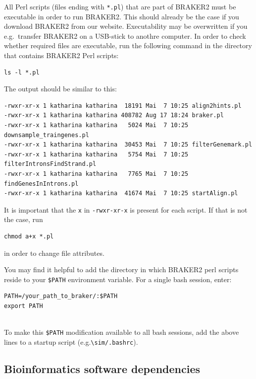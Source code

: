\documentclass[]{article}
\begin{document}
All Perl scripts (files ending with \texttt{*.pl}) that are part of
BRAKER2 must be executable in order to run BRAKER2. This should already
be the case if you download BRAKER2 from our website. Executability may
be overwritten if you e.g.~transfer BRAKER2 on a USB-stick to anothre
computer. In order to check whether required files are executable, run
the following command in the directory that contains BRAKER2 Perl
scripts:

\begin{verbatim}
ls -l *.pl
\end{verbatim}

The output should be similar to this:

\begin{verbatim}
-rwxr-xr-x 1 katharina katharina  18191 Mai  7 10:25 align2hints.pl
-rwxr-xr-x 1 katharina katharina 408782 Aug 17 18:24 braker.pl
-rwxr-xr-x 1 katharina katharina   5024 Mai  7 10:25 downsample_traingenes.pl
-rwxr-xr-x 1 katharina katharina  30453 Mai  7 10:25 filterGenemark.pl
-rwxr-xr-x 1 katharina katharina   5754 Mai  7 10:25 filterIntronsFindStrand.pl
-rwxr-xr-x 1 katharina katharina   7765 Mai  7 10:25 findGenesInIntrons.pl
-rwxr-xr-x 1 katharina katharina  41674 Mai  7 10:25 startAlign.pl
\end{verbatim}

It is important that the \texttt{x} in \texttt{-rwxr-xr-x} is present
for each script. If that is not the case, run

\begin{verbatim}
chmod a+x *.pl
\end{verbatim}

in order to change file attributes.

You may find it helpful to add the directory in which BRAKER2 perl
scripts reside to your \texttt{\$PATH} environment variable. For a
single bash session, enter:

\begin{verbatim}
PATH=/your_path_to_braker/:$PATH
export PATH
    
\end{verbatim}

To make this \texttt{\$PATH} modification available to all bash
sessions, add the above lines to a startup script
(e.g.\texttt{\textbackslash{}sim/.bashrc}).

\hypertarget{bioinformatics-software-dependencies}{\subsection{Bioinformatics
software dependencies}\label{bioinformatics-software-dependencies}}
\end{document}
